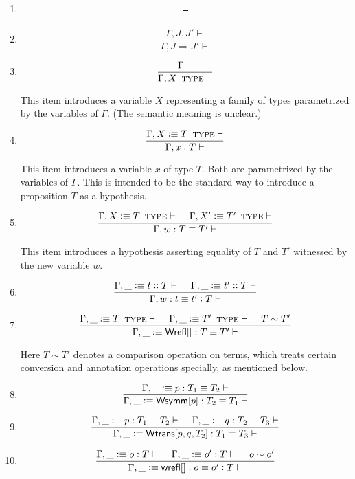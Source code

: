 \documentclass[11pt]{article}
\newcommand{\eqd}{\equiv}
\newcommand{\spc}{{\,\,\,\,\,\,\,}}
\newcommand{\ccolon}[1]{\vcentcolon#1}
\newcommand{\ccheck}[1]{\vcentcolon#1}  %
\newcommand{\csynth}[1]{\vcentcolon\vcentcolon #1} %
\newcommand{\Type}{\mathop{\text{ \sc type}}}
\newcommand{\Okay}{\mathop{\text{ \sc okay}}}
\newcommand{\Context}{\vdash\Okay}
\renewcommand{\Context}{\vdash}
\newcommand{\ha}[2]{#1[#2]}
\newcommand{\Wrefl}{{\sf Wrefl}}
\newcommand{\Wtrans}{{\sf Wtrans}}
\newcommand{\Wsymm}{{\sf Wsymm}}
\newcommand{\wrefl}{{\sf wrefl}}
\newcommand{\var}{\char`_}
\newcommand{\defn}{\vcentcolon\equiv}
\begin{document}
\begin{enumerate}

\item
$$\frac{}{\Context}$$

\item
$$\frac{\Gamma,J,J'\Context}{\Gamma,J \Rightarrow J' \Context}$$

\item
$$\frac{\Gamma\Context}{\Gamma, X \Type \Context}$$

This item introduces a variable $X$ representing a family of types parametrized
by the variables of $\Gamma$.  (The semantic meaning is unclear.)

\item
$$\frac{\Gamma, X \defn T \Type \Context}{\Gamma, x \ccolon{T} \Context}$$

This item introduces a variable $x$ of type $T$.  Both are parametrized by the
variables of $\Gamma$.  This is intended to be the standard way to introduce a
proposition $T$ as a hypothesis.

\item
$$\frac{
  \Gamma, X \defn T \Type\Context  
  \spc
  \Gamma, X' \defn T' \Type\Context }
{\Gamma, w : T \eqd T' \Context}$$

This item introduces a hypothesis asserting equality of $T$ and $T'$ witnessed
by the new variable $w$.


\item
  \[\frac{
  \Gamma, \var \defn t \csynth{T} \Context
  \spc
  \Gamma, \var \defn t' \csynth{T} \Context
  } {
  \Gamma, w : t \eqd t' \ccolon{T} \Context}\]

\item 
\[\frac{\Gamma, \var \defn T \Type \Context \spc \Gamma, \var \defn T'\Type \Context
  \spc T\sim T'}{
  \Gamma, \var \defn \ha\Wrefl{}: T\eqd T' \Context
}
\]

Here $T\sim T'$ denotes a comparison operation on terms, which treats certain
conversion and annotation operations specially, as mentioned below.

\item 
$$\frac{\Gamma,\var\defn p:T_1\eqd T_2 \Context }{\Gamma, \var\defn \ha\Wsymm{p}:T_2\eqd T_1 \Context}$$

\item 
\[
  \frac{
    \Gamma, \var \defn p:T_1\eqd T_2 \Context
    \spc
    \Gamma, \var \defn q:T_2\eqd T_3 \Context
  }
  {\Gamma, \var \defn \ha\Wtrans{p,q,T_2}: T_1\eqd T_3 \Context}
\]

\item 
\[\frac{
  \Gamma, \var \defn o \ccheck{T} \Context
  \spc
  \Gamma, \var \defn o' \ccheck{T} \Context
  \spc
  o \sim o'
  } {
  \Gamma, \var \defn  \ha\wrefl{}:o\eqd o' \ccolon{T} \Context
  } 
\]


\end{enumerate}
\end{document}
